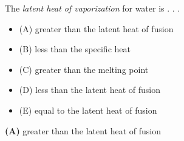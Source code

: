 

The {\it latent heat of vaporization} for water is . . .

\begin{itemize}
\item{(A)} greater than the latent heat of fusion
\vskip 5pt 
\item{(B)} less than the specific heat
\vskip 5pt 
\item{(C)} greater than the melting point
\vskip 5pt 
\item{(D)} less than the latent heat of fusion
\vskip 5pt 
\item{(E)} equal to the latent heat of fusion
\end{itemize}







{\bf (A)} greater than the latent heat of fusion
 










